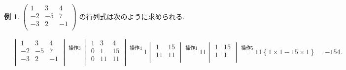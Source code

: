 \documentclass[dvipdfmx,a4paper,11pt]{article}
\theoremstyle{definition}
\newtheorem{exa}[thm]{例}
\begin{document}
  \begin{exa}
 $
 \begin{pmatrix}
 1&3&4\\
 -2&-5&7\\
 -3&2&-1\\
 \end{pmatrix}
$
の行列式は次のように求められる. 

\begin{align*}
 &\begin{vmatrix}
 1&3&4\\
 -2&-5&7\\
 -3&2&-1\\
 \end{vmatrix}
 \overset{\text{操作3}} {=}
 \begin{vmatrix}
 1&3&4\\
 0&1&15\\
 0&11&11\\
 \end{vmatrix}
 \overset{\text{操作4}} {=}
 1
 \begin{vmatrix}
1&15\\
11&11\\
 \end{vmatrix}
  \overset{\text{操作1}} {=}
 11
 \begin{vmatrix}
1&15\\
1&1\\
 \end{vmatrix}\overset{\text{操作5} } {=}
 11 \left\{ 1 \times 1 - 15 \times 1 \right\} 
 =
 -154.
 \end{align*}
 
\end{exa}
\end{document}
